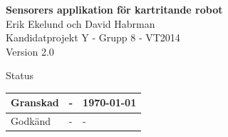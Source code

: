 \documentclass[a4paper,12pt,fleqn]{article}
\begin{document}
	\pagestyle{fancy}
	\vspace*{\fill}
		\begingroup
			\begin{center}
				\huge{\textbf{Sensorers applikation för kartritande robot}}
				\\
				\vspace{10pt}
				\normalsize
				Erik Ekelund och David Habrman
				\\
				Kandidatprojekt Y - Grupp 8 - VT2014
				\\
				Version 2.0
				\end{center}
		\endgroup
	\vspace*{\fill}
	
	\begin{center} %
		Status
		\\
		\vspace{3pt} %
	    \begin{tabular}{| p{3cm} | p{3cm} | p{3cm} |} %
	    \hline %
	    Granskad & - & \today \\ \hline %
		Godkänd & - & - \\ \hline %

	    \end{tabular}
	\end{center}
	\vspace{2cm}
	\newpage
	
\end{document}

